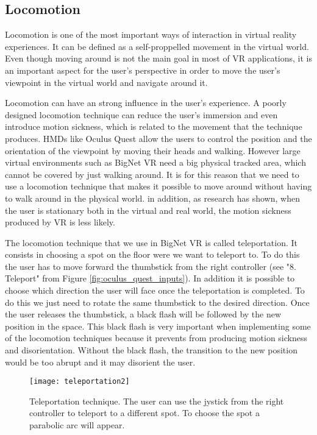 \subsection{Locomotion}
Locomotion is one of the most important ways of interaction in virtual reality experiences. It can be defined as a self-proppelled movement in the virtual world. Even though moving around is not the main goal in most of VR applications, it is an important aspect for the user's perspective in order to move the user's viewpoint in the virtual world and navigate around it.

Locomotion can have an strong influence in the user's experience. A poorly designed locomotion technique can reduce the user's immersion and even introduce motion sickness, which is related to the movement that the technique produces. HMDs like Oculus Quest allow the users to control the position and the orientation of the viewpoint by moving their heads and walking. However large virtual environments such as BigNet VR need a big physical tracked area, which cannot be covered by just walking around. It is for this reason that we need to use a locomotion technique that makes it possible to move around without having to walk around in the physical world\cite{locomotion_technique}. in addition, as research has shown, when the user is stationary both in the virtual and real world, the motion sickness produced by VR is less likely\cite{effect_vr_sickness}.

The locomotion technique that we use in BigNet VR is called teleportation. It consists in choosing a spot on the floor were we want to teleport to. To do this the user has to move forward the thumbstick from the right controller (see "8. Teleport" from Figure \ref{fig:oculus_quest_inputs}). In addition it is possible to choose which direction the user will face once the teleportation is completed. To do this we just need to rotate the same thumbstick to the desired direction. Once the user releases the thumbstick, a black flash will be followed by the new position in the space. This black flash is very important when implementing some of the locomotion techniques because it prevents from producing motion sickness and disorientation. Without the black flash, the transition to the new position would be too abrupt and it may disorient the user.

\begin{figure}[h!]
    \centering%
    \texttt{[image: teleportation2]}
    \caption{Teleportation technique. The user can use the jystick from the right controller to teleport to a different spot. To choose the spot a parabolic arc will appear.}
    \label{fig:teleportation}
\end{figure}%

